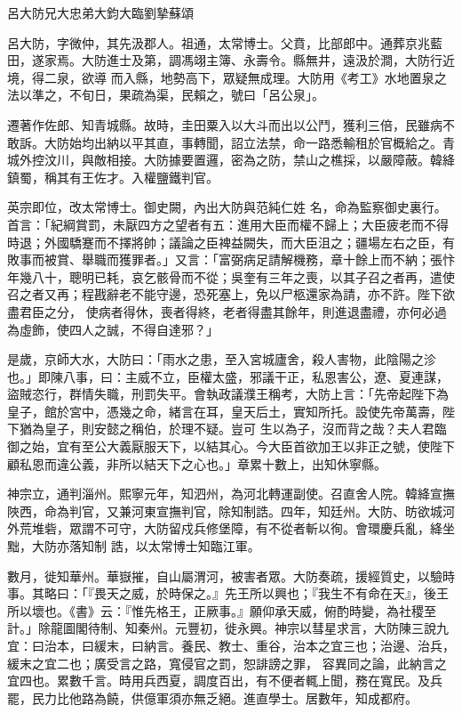 
\begin{pinyinscope}

 呂大防兄大忠弟大鈞大臨劉摯蘇頌



 呂大防，字微仲，其先汲郡人。祖通，太常博士。父賁，比部郎中。通葬京兆藍田，遂家焉。大防進士及第，調馮翊主簿、永壽令。縣無井，遠汲於澗，大防行近境，得二泉，欲導
 而入縣，地勢高下，眾疑無成理。大防用《考工》水地置泉之法以準之，不旬日，果疏為渠，民賴之，號曰「呂公泉」。



 遷著作佐郎、知青城縣。故時，圭田粟入以大斗而出以公鬥，獲利三倍，民雖病不敢訴。大防始均出納以平其直，事轉聞，詔立法禁，命一路悉輸租於官概給之。青城外控汶川，與敵相接。大防據要置邏，密為之防，禁山之樵採，以嚴障蔽。韓絳鎮蜀，稱其有王佐才。入權鹽鐵判官。



 英宗即位，改太常博士。御史闕，內出大防與范純仁姓
 名，命為監察御史裏行。首言：「紀綱賞罰，未厭四方之望者有五：進用大臣而權不歸上；大臣疲老而不得時退；外國驕蹇而不擇將帥；議論之臣裨益闕失，而大臣沮之；疆場左右之臣，有敗事而被賞、舉職而獲罪者。」又言：「富弼病足請解機務，章十餘上而不納；張忭年幾八十，聰明已耗，哀乞骸骨而不從；吳奎有三年之喪，以其子召之者再，遣使召之者又再；程戡辭老不能守邊，恐死塞上，免以尸柩還家為請，亦不許。陛下欲盡君臣之分，
 使病者得休，喪者得終，老者得盡其餘年，則進退盡禮，亦何必過為虛飾，使四人之誠，不得自達邪？」



 是歲，京師大水，大防曰：「雨水之患，至入宮城廬舍，殺人害物，此陰陽之沴也。」即陳八事，曰：主威不立，臣權太盛，邪議干正，私恩害公，遼、夏連謀，盜賊恣行，群情失職，刑罰失平。會執政議濮王稱考，大防上言：「先帝起陛下為皇子，館於宮中，憑幾之命，緒言在耳，皇天后土，實知所托。設使先帝萬壽，陛下猶為皇子，則安懿之稱伯，於理不疑。豈可
 生以為子，沒而背之哉？夫人君臨御之始，宜有至公大義厭服天下，以結其心。今大臣首欲加王以非正之號，使陛下顧私恩而違公義，非所以結天下之心也。」章累十數上，出知休寧縣。



 神宗立，通判淄州。熙寧元年，知泗州，為河北轉運副使。召直舍人院。韓絳宣撫陜西，命為判官，又兼河東宣撫判官，除知制誥。四年，知廷州。大防、昉欲城河外荒堆砦，眾謂不可守，大防留戍兵修堡障，有不從者斬以徇。會環慶兵亂，絳坐黜，大防亦落知制
 誥，以太常博士知臨江軍。



 數月，徙知華州。華嶽摧，自山屬渭河，被害者眾。大防奏疏，援經質史，以驗時事。其略曰：「『畏天之威，於時保之。』先王所以興也；『我生不有命在天』，後王所以壞也。《書》云：『惟先格王，正厥事。』願仰承天威，俯酌時變，為社稷至計。」除龍圖閣待制、知秦州。元豐初，徙永興。神宗以彗星求言，大防陳三說九宜：曰治本，曰緩末，曰納言。養民、教士、重谷，治本之宜三也；治邊、治兵，緩末之宜二也；廣受言之路，寬侵官之罰，恕誹謗之罪，
 容異同之論，此納言之宜四也。累數千言。時用兵西夏，調度百出，有不便者輒上聞，務在寬民。及兵罷，民力比他路為饒，供億軍須亦無乏絕。進直學士。居數年，知成都府。




\end{pinyinscope}
